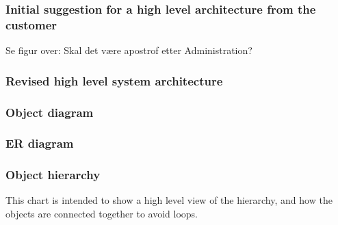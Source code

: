 \subsubsection{Initial suggestion for a high level architecture from the customer}
Se figur over: Skal det være apostrof etter Administration?

\subsubsection{Revised high level system architecture}

\subsubsection{Object diagram}


\subsubsection{ER diagram}

\subsubsection{Object hierarchy}
This chart is intended to show a high level view of the hierarchy, and how the objects are connected together to avoid loops. 








